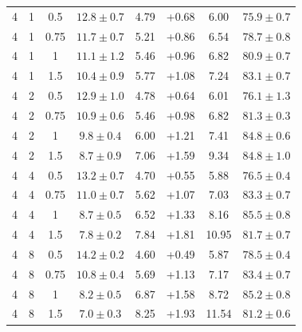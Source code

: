 \documentclass{article}
\begin{document}
\begin{table}[!htbp]
\begin{tabular}{cccccccc}
4 & 1 & 0.5 & $12.8\pm0.7$ & 4.79 & +0.68 & 6.00 & $75.9\pm0.7$\\
4 & 1 & 0.75 & $11.7\pm0.7$ & 5.21 & +0.86 & 6.54 & $78.7\pm0.8$\\
4 & 1 & 1 & $11.1\pm1.2$ & 5.46 & +0.96 & 6.82 & $80.9\pm0.7$\\
4 & 1 & 1.5 & $10.4\pm0.9$ & 5.77 & +1.08 & 7.24 & $83.1\pm0.7$\\
4 & 2 & 0.5 & $12.9\pm1.0$ & 4.78 & +0.64 & 6.01 & $76.1\pm1.3$\\
4 & 2 & 0.75 & $10.9\pm0.6$ & 5.46 & +0.98 & 6.82 & $81.3\pm0.3$\\
4 & 2 & 1 & $9.8\pm0.4$ & 6.00 & +1.21 & 7.41 & $84.8\pm0.6$\\
4 & 2 & 1.5 & $8.7\pm0.9$ & 7.06 & +1.59 & 9.34 & $84.8\pm1.0$\\
4 & 4 & 0.5 & $13.2\pm0.7$ & 4.70 & +0.55 & 5.88 & $76.5\pm0.4$\\
4 & 4 & 0.75 & $11.0\pm0.7$ & 5.62 & +1.07 & 7.03 & $83.3\pm0.7$\\
4 & 4 & 1 & $8.7\pm0.5$ & 6.52 & +1.33 & 8.16 & $85.5\pm0.8$\\
4 & 4 & 1.5 & $7.8\pm0.2$ & 7.84 & +1.81 & 10.95 & $81.7\pm0.7$\\
4 & 8 & 0.5 & $14.2\pm0.2$ & 4.60 & +0.49 & 5.87 & $78.5\pm0.4$\\
4 & 8 & 0.75 & $10.8\pm0.4$ & 5.69 & +1.13 & 7.17 & $83.4\pm0.7$\\
4 & 8 & 1 & $8.2\pm0.5$ & 6.87 & +1.58 & 8.72 & $85.2\pm0.8$\\
4 & 8 & 1.5 & $7.0\pm0.3$ & 8.25 & +1.93 & 11.54 & $81.2\pm0.6$\\
\bottomrule
\end{tabular}
\end{table}
\clearpage
\end{document}
